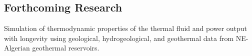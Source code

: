\documentclass[a0,portrait]{a0poster}
\begin{document}
\begin{multicols}{3}
\section*{Forthcoming Research}

Simulation of thermodynamic properties of the thermal fluid and power output with longevity using geological, hydrogeological, and geothermal data from NE-Algerian geothermal reservoirs. 


\nocite{*} %


\end{multicols}
\end{document}
